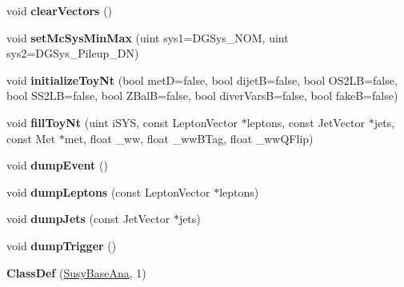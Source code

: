 \begin{DoxyCompactItemize}
\item 
\hypertarget{classSusyBaseAna_add60fe54c904c946639aa129b12d48b5}{
void {\bfseries clearVectors} ()}
\label{classSusyBaseAna_add60fe54c904c946639aa129b12d48b5}

\item 
\hypertarget{classSusyBaseAna_a77b45dc84d04140ac293aee3b5012745}{
void {\bfseries setMcSysMinMax} (uint sys1=DGSys\_\-NOM, uint sys2=DGSys\_\-Pileup\_\-DN)}
\label{classSusyBaseAna_a77b45dc84d04140ac293aee3b5012745}

\item 
\hypertarget{classSusyBaseAna_a7167e1ce20469860098d8a593400901e}{
void {\bfseries initializeToyNt} (bool metD=false, bool dijetB=false, bool OS2LB=false, bool SS2LB=false, bool ZBalB=false, bool diverVarsB=false, bool fakeB=false)}
\label{classSusyBaseAna_a7167e1ce20469860098d8a593400901e}

\item 
\hypertarget{classSusyBaseAna_a9acbfd9acb5d7b6f2ec899ad005b9786}{
void {\bfseries fillToyNt} (uint iSYS, const LeptonVector $\ast$leptons, const JetVector $\ast$jets, const Met $\ast$met, float \_\-ww, float \_\-wwBTag, float \_\-wwQFlip)}
\label{classSusyBaseAna_a9acbfd9acb5d7b6f2ec899ad005b9786}

\item 
\hypertarget{classSusyBaseAna_a6f6a198f8cc0f7b295caa7ca981bece7}{
void {\bfseries dumpEvent} ()}
\label{classSusyBaseAna_a6f6a198f8cc0f7b295caa7ca981bece7}

\item 
\hypertarget{classSusyBaseAna_a64cb7644fc15d4342013d9c313f940eb}{
void {\bfseries dumpLeptons} (const LeptonVector $\ast$leptons)}
\label{classSusyBaseAna_a64cb7644fc15d4342013d9c313f940eb}

\item 
\hypertarget{classSusyBaseAna_ac74908d780e64ea0ae016d87d1a2ff65}{
void {\bfseries dumpJets} (const JetVector $\ast$jets)}
\label{classSusyBaseAna_ac74908d780e64ea0ae016d87d1a2ff65}

\item 
\hypertarget{classSusyBaseAna_a110acd130bf5ee0b7ed2f74a9ed949d9}{
void {\bfseries dumpTrigger} ()}
\label{classSusyBaseAna_a110acd130bf5ee0b7ed2f74a9ed949d9}

\item 
\hypertarget{classSusyBaseAna_a5579c2261e2f72d0c753361273e9b579}{
{\bfseries ClassDef} (\hyperlink{classSusyBaseAna}{SusyBaseAna}, 1)}
\label{classSusyBaseAna_a5579c2261e2f72d0c753361273e9b579}

\end{DoxyCompactItemize}
